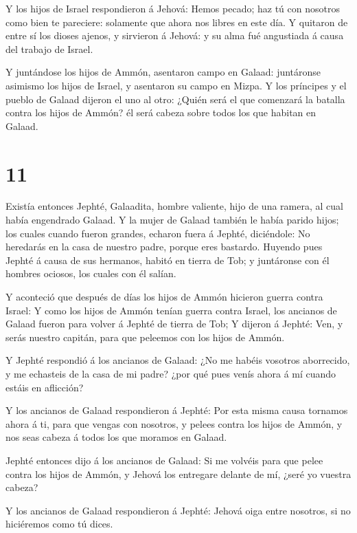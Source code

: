  Y los hijos de Israel respondieron á Jehová: Hemos pecado;
haz tú con nosotros como bien te pareciere: solamente que ahora nos
libres en este día.  Y quitaron de entre sí los dioses
ajenos, y sirvieron á Jehová: y su alma fué angustiada á causa del
trabajo de Israel.

 Y juntándose los hijos de Ammón, asentaron campo en
Galaad: juntáronse asimismo los hijos de Israel, y asentaron su campo en
Mizpa.  Y los príncipes y el pueblo de Galaad dijeron el
uno al otro: ¿Quién será el que comenzará la batalla contra los hijos de
Ammón? él será cabeza sobre todos los que habitan en Galaad.

\hypertarget{section-10}{%
\section{11}\label{section-10}}

 Existía entonces Jephté, Galaadita, hombre valiente, hijo
de una ramera, al cual había engendrado Galaad.  Y la mujer
de Galaad también le había parido hijos; los cuales cuando fueron
grandes, echaron fuera á Jephté, diciéndole: No heredarás en la casa de
nuestro padre, porque eres bastardo.  Huyendo pues Jephté á
causa de sus hermanos, habitó en tierra de Tob; y juntáronse con él
hombres ociosos, los cuales con él salían.

 Y aconteció que después de días los hijos de Ammón hicieron
guerra contra Israel:  Y como los hijos de Ammón tenían
guerra contra Israel, los ancianos de Galaad fueron para volver á Jephté
de tierra de Tob;  Y dijeron á Jephté: Ven, y serás nuestro
capitán, para que peleemos con los hijos de Ammón.

 Y Jephté respondió á los ancianos de Galaad: ¿No me habéis
vosotros aborrecido, y me echasteis de la casa de mi padre? ¿por qué
pues venís ahora á mí cuando estáis en aflicción?

 Y los ancianos de Galaad respondieron á Jephté: Por esta
misma causa tornamos ahora á ti, para que vengas con nosotros, y pelees
contra los hijos de Ammón, y nos seas cabeza á todos los que moramos en
Galaad.

 Jephté entonces dijo á los ancianos de Galaad: Si me
volvéis para que pelee contra los hijos de Ammón, y Jehová los entregare
delante de mí, ¿seré yo vuestra cabeza?

 Y los ancianos de Galaad respondieron á Jephté: Jehová
oiga entre nosotros, si no hiciéremos como tú dices.

